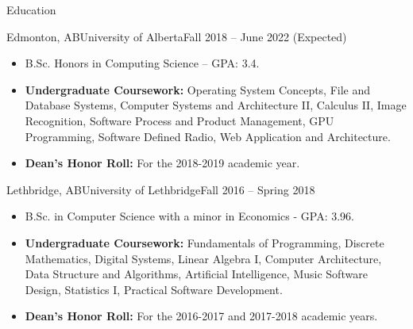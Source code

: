 \documentclass[]{mcdowellcv}
\begin{document}
\makeheader


\begin{cvsection}{Education}
  \begin{cvsubsection}{Edmonton, AB}{University of Alberta}{Fall 2018 -- June 2022 (Expected)}
    \begin{itemize}
      \item B.Sc. Honors in Computing Science -- GPA: 3.4.
      \item \textbf{Undergraduate Coursework:} 
        Operating System Concepts,
        File and Database Systems,
        Computer Systems and Architecture II,
        Calculus II,
        Image Recognition,
        Software Process and Product Management,
        GPU Programming, 
        Software Defined Radio, 
        Web Application and Architecture.
      \item \textbf{Dean's Honor Roll:} For the 2018-2019 academic year. 
    \end{itemize}
  \end{cvsubsection}

  \begin{cvsubsection}{Lethbridge, AB}{University of Lethbridge}{Fall 2016 -- Spring 2018}
    \begin{itemize}   
      \item B.Sc. in Computer Science with a minor in Economics - GPA: 3.96.
      \item \textbf{Undergraduate Coursework:} 
        Fundamentals of Programming,
        Discrete Mathematics,
        Digital Systems,
        Linear Algebra I,
        Computer Architecture,
        Data Structure and Algorithms,
        Artificial Intelligence,
        Music Software Design,
        Statistics I,
        Practical Software Development.
      \item \textbf{Dean's Honor Roll:} For the 2016-2017 and 2017-2018 academic years.
    \end{itemize}
  \end{cvsubsection}
\end{cvsection}
\end{document}
